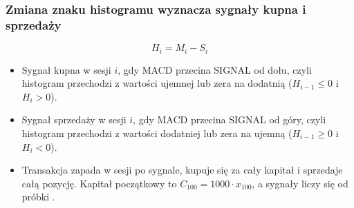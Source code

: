 \begin{frame}
  \frametitle{Zmiana znaku histogramu wyznacza sygnały kupna i sprzedaży}
  \begin{equation*}
    H_i = M_i - S_i
    \tag{4}
  \end{equation*}
  \vskip2mm
  \begin{itemize}
    \item Sygnał kupna w sesji $i$, gdy MACD przecina SIGNAL od dołu, czyli
      histogram przechodzi z wartości ujemnej lub zera na dodatnią
      ($H_{i-1} \le 0$ i $H_i > 0$).
    \item Sygnał sprzedaży w sesji $i$, gdy MACD przecina SIGNAL od góry,
      czyli histogram przechodzi z wartości dodatniej lub zera na ujemną
      ($H_{i-1} \ge 0$ i $H_i < 0$).
    \item Transakcja zapada w sesji po sygnale, kupuje się za cały kapitał
      i sprzedaje całą pozycję. Kapitał początkowy to
      $C_{100} = 1000 \cdot x_{100}$, a sygnały liczy się od próbki
      \resFirstSignalIndex{}.
  \end{itemize}
\end{frame}
